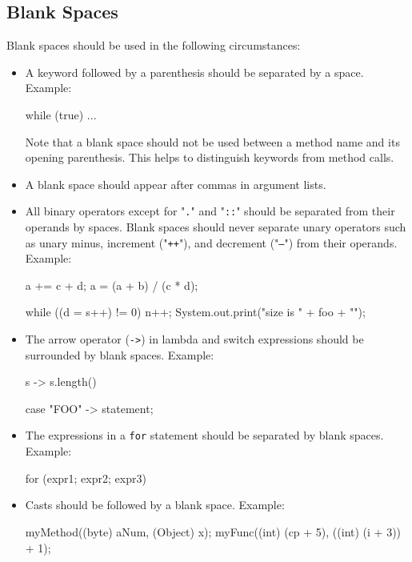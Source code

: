 \documentclass{article}
\begin{document}
\subsection{Blank Spaces}

Blank spaces should be used in the following circumstances:

\begin{itemize}
\item A keyword followed by a parenthesis should be separated by a space. Example: \\
\begin{snippet}
while (true) {
    ...
}
\end{snippet}

  Note that a blank space should not be used between a method name and its opening parenthesis.
  This helps to distinguish keywords from method calls.
%
\item A blank space should appear after commas in argument lists.
%
\item All binary operators except for "\texttt{.}" and "\texttt{::}" should be separated from their
  operands by spaces. Blank spaces should never separate unary operators such as unary minus,
  increment ("\texttt{++}"), and decrement ("\texttt{--}") from their operands.
  Example: \\
\begin{snippet}
a += c + d;
a = (a + b) / (c * d);

while ((d = s++) != 0) {
    n++;
}
System.out.print("size is " + foo + "\n");
\end{snippet}
%
\item The arrow operator (\texttt{->}) in lambda and switch expressions should be surrounded by
  blank spaces. Example: \\
\begin{snippet}
  s -> s.length()

  case "FOO" -> statement;
\end{snippet}
%
\item The expressions in a \texttt{for} statement should be separated by blank spaces. Example: \\
\begin{snippet}
for (expr1; expr2; expr3)
\end{snippet}
%
\item Casts should be followed by a blank space. Example: \\
\begin{snippet}
myMethod((byte) aNum, (Object) x);
myFunc((int) (cp + 5), ((int) (i + 3)) + 1);
\end{snippet}
\end{itemize}
\end{document}
